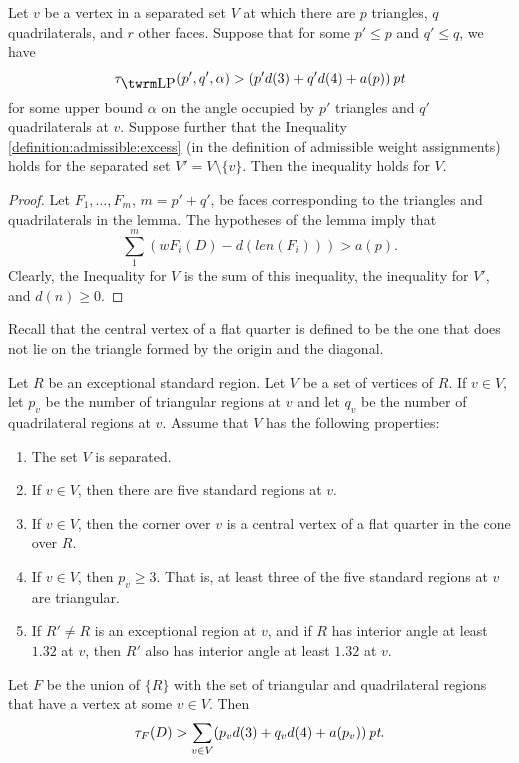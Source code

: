 \begin{lemma}
\label{lemma:split}
 Let $v$ be a vertex in a separated set $V$ at which there are $p$
triangles, $q$ quadrilaterals, and $r$ other faces.  Suppose that
for some $p'\le p$ and $q'\le q$, we have
    $$\tauLP(p',q',\alpha) > ( p' d(3) + q' d(4) + a(p))\,\pt$$
for some upper bound $\alpha$ on the angle occupied by $p'$
triangles and $q'$ quadrilaterals at $v$.  Suppose further that
the Inequality \ref{definition:admissible:excess} (in the
definition of admissible weight assignments) holds for the
separated set $V' = V\setminus \{v\}$. Then the inequality holds
for $V$.
\end{lemma}

\begin{proof}  Let $F_1,\ldots,F_m$, $m={p'+q'}$, be faces corresponding
to the triangles and quadrilaterals in the lemma.  The hypotheses
of the lemma imply that
    $$\sum_{1}^{m} (w{F_i}(D) - d(len(F_i))) > a(p).$$
Clearly, the Inequality for $V$ is the sum of this inequality, the
inequality for $V'$, and $d(n)\ge0$.
\end{proof}


Recall that the central vertex of a flat quarter is defined to be
the one that does not lie on the triangle formed by the origin and
the diagonal.
%

\begin{lemma} \label{lemma:excess-1:bis}
Let $R$ be an exceptional standard region.  Let $V$
be a set of vertices of $R$.  If $v\in V$, let $p_v$ be the number
of triangular regions at $v$ and let $q_v$ be the number of
quadrilateral regions at $v$.  Assume that $V$ has the following
properties:
    \begin{enumerate}
        \item The set $V$ is separated.
        \item If $v\in V$, then there are five standard regions at
        $v$.
        \item If $v\in V$, then the corner over $v$ is a central
        vertex of a flat quarter in the cone over $R$.
        \item If $v\in V$, then $p_v\ge 3$.  That is, at least
        three of the five standard regions at $v$ are triangular.
        \item If $R'\ne R$ is an exceptional region at $v$, and if $R$
        has interior angle at least $1.32$ at $v$, then $R'$ also has interior
        angle at least $1.32$ at $v$.
    \end{enumerate}
Let $F$ be the union of $\{R\}$ with the set of triangular and
quadrilateral regions that have a vertex at some $v\in V$. Then
    $$\tau_F(D) > \sum_{v\in V} (p_v d(3) + q_v d(4) + a
    (p_v))\,\hbox{\it pt}.$$
\end{lemma}

